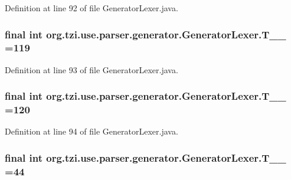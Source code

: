 Definition at line 92 of file Generator\-Lexer.\-java.

\hypertarget{classorg_1_1tzi_1_1use_1_1parser_1_1generator_1_1_generator_lexer_a3d0c289cf5f11b98d955d66096762e5d}{
\subsubsection[{T\-\_\-\-\_\-119}]{\setlength{\rightskip}{0pt plus 5cm}final int org.\-tzi.\-use.\-parser.\-generator.\-Generator\-Lexer.\-T\-\_\-\-\_ =119\hspace{0.3cm}{\ttfamily [static]}}}\label{classorg_1_1tzi_1_1use_1_1parser_1_1generator_1_1_generator_lexer_a3d0c289cf5f11b98d955d66096762e5d}


Definition at line 93 of file Generator\-Lexer.\-java.

\hypertarget{classorg_1_1tzi_1_1use_1_1parser_1_1generator_1_1_generator_lexer_a1cece1ec5b25d6fbfaa74b80883da3d0}{
\subsubsection[{T\-\_\-\-\_\-120}]{\setlength{\rightskip}{0pt plus 5cm}final int org.\-tzi.\-use.\-parser.\-generator.\-Generator\-Lexer.\-T\-\_\-\-\_ =120\hspace{0.3cm}{\ttfamily [static]}}}\label{classorg_1_1tzi_1_1use_1_1parser_1_1generator_1_1_generator_lexer_a1cece1ec5b25d6fbfaa74b80883da3d0}


Definition at line 94 of file Generator\-Lexer.\-java.

\hypertarget{classorg_1_1tzi_1_1use_1_1parser_1_1generator_1_1_generator_lexer_a47864cf285aa8ce99dad23a4e8c5564c}{
\subsubsection[{T\-\_\-\-\_\-44}]{\setlength{\rightskip}{0pt plus 5cm}final int org.\-tzi.\-use.\-parser.\-generator.\-Generator\-Lexer.\-T\-\_\-\-\_ =44\hspace{0.3cm}{\ttfamily [static]}}}\label{classorg_1_1tzi_1_1use_1_1parser_1_1generator_1_1_generator_lexer_a47864cf285aa8ce99dad23a4e8c5564c}


